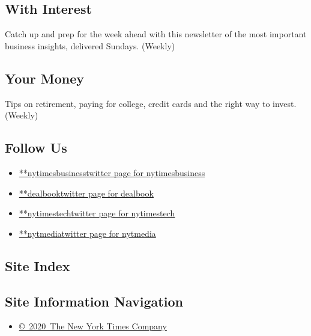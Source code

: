 \hypertarget{with-interest}{%
\subsection{With Interest}\label{with-interest}}

Catch up and prep for the week ahead with this newsletter of the most
important business insights, delivered Sundays. (Weekly)

\hypertarget{your-money}{%
\subsection{Your Money}\label{your-money}}

Tips on retirement, paying for college, credit cards and the right way
to invest. (Weekly)

\hypertarget{follow-us}{%
\subsection{Follow Us}\label{follow-us}}

\begin{itemize}
\tightlist
\item
  \href{https://twitter.com/nytimesbusiness}{**nytimesbusinesstwitter
  page for nytimesbusiness}
\item
  \href{https://twitter.com/dealbook}{**dealbooktwitter page for
  dealbook}
\item
  \href{https://twitter.com/nytimestech}{**nytimestechtwitter page for
  nytimestech}
\item
  \href{https://twitter.com/nytmedia}{**nytmediatwitter page for
  nytmedia}
\end{itemize}

\hypertarget{site-index}{%
\subsection{Site Index}\label{site-index}}

\hypertarget{site-information-navigation}{%
\subsection{Site Information
Navigation}\label{site-information-navigation}}

\begin{itemize}
\tightlist
\item
  \href{https://help.nytimes.com/hc/en-us/articles/115014792127-Copyright-notice}{©~2020~The
  New York Times Company}
\end{itemize}

